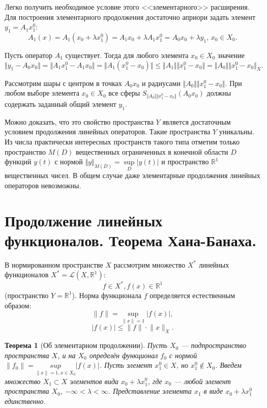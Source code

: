 \documentclass[12pt,a4paper,titlepage,oneside]{book}
\theoremstyle{definition}
\theoremstyle{plain}
\theoremstyle{break}
\newtheorem*{theorem-break}{Теорема}
\theoremstyle{remark}
\theoremstyle{remark}
\theoremstyle{remark}
\theoremstyle{remark}
\theoremstyle{plain}
\theoremstyle{plain}
\begin{document}
Легко получить необходимое условие этого <<элементарного>> расширения. Для построения элементарного продолжения достаточно априори задать элемент $y_1 = A_1 x_1^0$:
$$A_1(x) = A_1(x_0+\lambda x_1^0) = A_1x_0+\lambda A_1x_1^0 = A_0 x_0 + \lambda y_1 \mbox{, } x_0 \in X_0.$$

Пусть оператор $A_1$ существует. Тогда для любого элемента $x_0 \in X_0$ значение
$$\Vert y_1 -A_0x_0 \Vert = \Vert A_1x_1^0 - A_1x_0 \Vert = \Vert A_1(x_1^0 - x_0) \Vert \leqslant \Vert A_1 \Vert \Vert x_1^0 - x_0 \Vert = \Vert A_0 \Vert \Vert x_1^0 - x_0 \Vert_X.$$

Рассмотрим шары с центром в точках $A_0x_0$ и радиусами $\Vert A_0 \Vert \Vert x_1^0 - x_0 \Vert$. При любом выборе элемента $x_0 \in X_0$ все сферы $S_{\Vert A_0 \Vert \Vert x_1^0 - x_0 \Vert}(A_0x_0)$ должны содержать заданный общий элемент $y_1$.

Можно доказать, что это свойство пространства $Y$ является достаточным условием продолжения линейных операторов. Такие пространства $Y$ уникальны. Из числа практически интересных пространств такого типа отметим только пространство $M(\mathit{D})$ вещественных ограниченных в конечной области $D$ функций $y(t)$ с нормой $\Vert y\Vert_{M(D)} = \sup \limits_D\lvert y(t) \rvert$ и пространство $\mathbb{R}^1$ вещественных чисел.
В общем случае даже элементарные продолжения линейных операторов невозможны.

\section{Продолжение линейных функционалов. Теорема Хана-Банаха.}
В нормированном пространстве $X$ рассмотрим множество $X^*$ линейных функционалов $X^*=\mathcal{L}(X, \mathbb{R}^1)$:
$$f\in X^*, f(x)\in \mathbb{R}^1$$ (пространство $Y=\mathbb{R}^1$).
Норма функционала $f$ определяется естественным образом:
$$\lVert f \rVert = \underset{\lVert x \rVert=1}{\sup} \lvert f(x) \rvert,$$
$$\lvert f(x) \rvert \leqslant \lVert f \rVert \cdot \lVert x \rVert_X.$$

\begin{theorem-break}[Об элементарном продолжении]
Пусть $X_0$ --- подпространство пространства $X$, и на $X_0$ определён функционал $f_0$ с нормой $\lVert f_0 \rVert = \underset{\lVert x \rVert=1, x \in X_0}{sup}|f(x)|$. Пусть элемент $x_1^0 \in X$, но $x_1^0 \notin X_0$.
Введем множество $X_1 \subset X$ элементов вида $x_0+\lambda x_1^0$, где $x_0$ --- любой элемент пространства $X_0$, $-\infty < \lambda < \infty$. Представление элемента $x_1$ в виде $x_0+\lambda x_1^0$ единственно.
\end{theorem-break}
\end{document}
